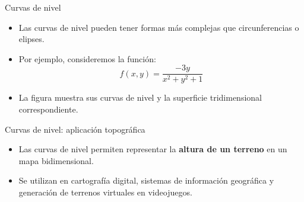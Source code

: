 \documentclass[main.tex]{subfiles}
\begin{document}
\begin{frame}{Curvas de nivel}
  \begin{itemize}
    \item Las curvas de nivel pueden tener formas más complejas
          que circunferencias o elipses.

    \item Por ejemplo, consideremos la función:
          \[
            f(x,y)=\frac{-3y}{x^2+y^2+1}
          \]

    \item La figura muestra sus curvas de nivel y la superficie
          tridimensional correspondiente.
  \end{itemize}

\end{frame}

\begin{frame}{Curvas de nivel: aplicación topográfica}
  \begin{itemize}
    \item Las curvas de nivel permiten representar la
          \textbf{altura de un terreno} en un mapa bidimensional.

    \item Se utilizan en cartografía digital, sistemas de información
          geográfica y generación de terrenos virtuales en videojuegos.
  \end{itemize}

\end{frame}

\end{document}
